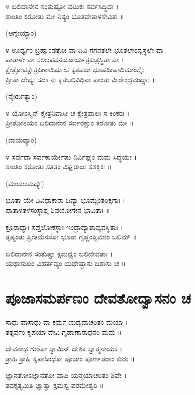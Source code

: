೪ ಬಲಿದಾನೇನ ಸಂತುಷ್ಟೋ ವಟುಕಃ ಸರ್ವಸಿದ್ಧಿದಃ ।\\
ಶಾಂತಿಂ ಕರೋತು ಮೇ ನಿತ್ಯಂ ಭೂತವೇತಾಳಸೇವಿತಃ ॥

(ಆಗ್ನೇಯ್ಯಾಂ)\\

೪ ಊರ್ಧ್ವಂ ಬ್ರಹ್ಮಾಂಡತೋ ವಾ ದಿವಿ ಗಗನತಲೇ ಭೂತಲೇಽನ್ಯಸ್ಥಲೇ ವಾ\\
ಪಾತಾಳೇ ವಾ ಸಲಿಲಪವನಯೋರ್ಯತ್ರಕುತ್ರಸ್ಥಿತಾ ವಾ ।\\
ಕ್ಷೇತ್ರೋಪಕ್ಷೇತ್ರಪೀಠಾದಿಷು ಚ ಕೃತಪದಾ ಧೂಪದೀಪಾದಿಮಾಂಸೈಃ\\
ಪ್ರೀತಾ ದೇವ್ಯಃ ಸದಾ ನಃ ಕೃತಬಲಿವಿಧಿನಾ ಪಾಂತು ವೀರೇಂದ್ರವಂದ್ಯಾಃ ॥

(ನೈರ್ಋತ್ಯಾಂ)\\

೪ ಯೋಽಸ್ಮಿನ್ ಕ್ಷೇತ್ರನಿವಾಸೀ ಚ ಕ್ಷೇತ್ರಪಾಲಃ ಸ ಕಿಂಕರಃ ।\\
ಪ್ರೀತೋಽಯಂ ಬಲಿದಾನೇನ ಸರ್ವರಕ್ಷಾಂ ಕರೋತು ಮೇ ॥

(ವಾಯವ್ಯಾಂ)\\

೪ ಸರ್ವದಾ ಸರ್ವಕಾರ್ಯೇಷು ನಿರ್ವಿಘ್ನಂ ಮಮ ಸಿದ್ಧಯೇ ।\\
ಶಾಂತಿಂ ಕರೋತು ಸತತಂ ವಿಘ್ನರಾಜಃ ಸಶಕ್ತಿಕಃ ॥

(ಮಂಡಲಮಧ್ಯೇ)\\

ಭೂತಾ ಯೇ ವಿವಿಧಾಕಾರಾ ದಿವ್ಯಾ ಭೂಮ್ಯಂತರಿಕ್ಷಗಾಃ ।\\
ಪಾತಾಳತಳಸಂಸ್ಥಾಶ್ಚ ಶಿವಯೋಗೇನ ಭಾವಿತಾಃ ॥

ಕ್ರೂರಾದ್ಯಾಃ ಸಪ್ತಲೋಕಸ್ಥಾಃ ಇಂದ್ರಾದ್ಯಾಶಾವ್ಯವಸ್ಥಿತಾಃ ।\\
ತೃಪ್ಯಂತು ಪ್ರೀತಮನಸೋ ಭೂತಾ ಗೃಹ್ಣಂತ್ವಿಮಾಂ ಬಲಿಮ್ ॥

ಬಲಿದಾನೇನ ಸಂತುಷ್ಟಾ  ಕ್ಷಮಧ್ವಂ ಬಲಿದೇವತಾಃ ।\\
ಯಥಾಸುಖಂ ವಿಹರ್ತವ್ಯಂ ಯಥೇಷ್ಟಾಸು ದಿಶಾಸು ಚ ॥
\section{ಪೂಜಾಸಮರ್ಪಣಂ ದೇವತೋದ್ವಾಸನಂ ಚ}
ಸಾಧು ವಾಸಾಧು ವಾ ಕರ್ಮ ಯದ್ಯದಾಚರಿತಂ ಮಯಾ ।\\ ತತ್ಸರ್ವಂ ಕೃಪಯಾ ದೇವಿ ಗೃಹಾಣಾರಾಧನಂ ಮಮ ॥

ದೇವನಾಥ ಗುರೋ ಸ್ವಾಮಿನ್ ದೇಶಿಕ ಸ್ವಾತ್ಮನಾಯಕ ।\\ ತ್ರಾಹಿ ತ್ರಾಹಿ ಕೃಪಾಸಿಂಧೋ ಪೂಜಾಂ ಪೂರ್ಣತರಾಂ ಕುರು ॥

ಜ್ಞಾನತೋಽಜ್ಞಾನತೋ ವಾಪಿ ಯನ್ಮಯಾಚರಿತಂ ಶಿವೇ ।\\ ತವಕೃತ್ಯಮಿತಿ ಜ್ಞಾತ್ವಾ ಕ್ಷಮಸ್ವ ಪರಮೇಶ್ವರಿ ॥

